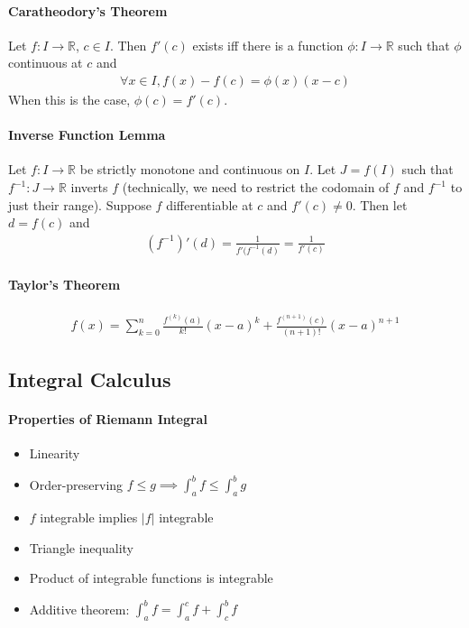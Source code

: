 \documentclass{article}
\begin{document}
\paragraph{Caratheodory's Theorem}
Let $f: I\rightarrow \mathbb{R}$, $c\in I$. Then $f'(c)$ exists iff there is a function $\phi: I\rightarrow \mathbb{R}$ such that $\phi$ continuous at $c$ and
\begin{align*}
	\forall x\in I, f(x)-f(c) = \phi(x)(x-c)
\end{align*}
When this is the case, $\phi(c) = f'(c)$.

\paragraph{Inverse Function Lemma}
Let $f:I\rightarrow \mathbb{R}$ be strictly monotone and continuous on $I$. Let $J=f(I)$ such that $f^{-1}:J\rightarrow \mathbb{R}$ inverts $f$ (technically, we need to restrict the codomain of $f$ and $f^{-1}$ to just their range). Suppose $f$ differentiable at $c$ and $f'(c)\neq 0$. Then let $d=f(c)$ and
\begin{align*}
	(f^{-1})'(d) = \frac{1}{f'(f^{-1}(d)} = \frac{1}{f'(c)}
\end{align*}

\paragraph{Taylor's Theorem}
\begin{align*}
	f(x) = \sum_{k=0}^n\frac{f^{(k)}(a)}{k!}(x-a)^k + \frac{f^{(n+1)}(c)}{(n+1)!}(x-a)^{n+1}
\end{align*}

\subsection{Integral Calculus}
\paragraph{Properties of Riemann Integral}
\begin{itemize}
	\item Linearity
	\item Order-preserving $f\leq g\implies \int_a^b f\leq \int_a^b g$
	\item $f$ integrable implies $|f|$ integrable
	\item Triangle inequality
	\item Product of integrable functions is integrable
	\item Additive theorem: $\int_a^b f = \int_a^c f + \int_c^b f$
\end{itemize}
\end{document}
